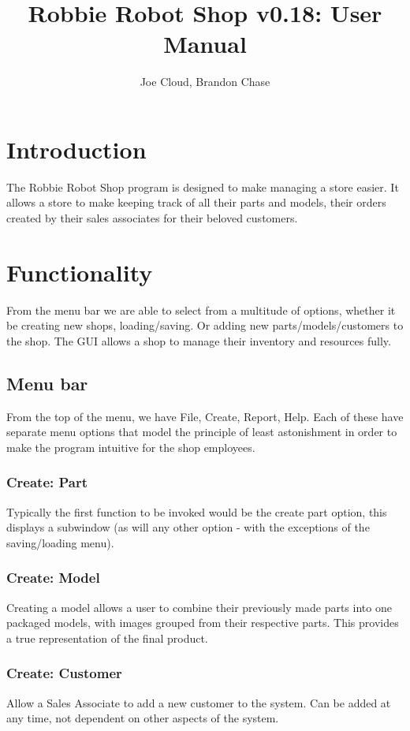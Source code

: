 \documentclass{article}
\title{Robbie Robot Shop v0.18: User Manual}
\author{Joe Cloud, Brandon Chase}
\begin{document}
\maketitle 

\section{Introduction}

The Robbie Robot Shop program is designed to make managing a store easier. It allows a store to make keeping track of all their parts and models, their orders created by their sales associates for their beloved customers. 

\section{Functionality}
From the menu bar we are able to select from a multitude of options, whether it be creating new shops, loading/saving. Or adding new parts/models/customers to the shop. The GUI allows a shop to manage their inventory and resources fully.
\subsection{Menu bar}
From the top of the menu, we have File, Create, Report, Help.
Each of these have separate menu options that model the principle of least astonishment in order to make the program intuitive for the shop employees.

\subsubsection{Create: Part}
Typically the first function to be invoked would be the create part option, this displays a subwindow (as will any other option - with the exceptions of the saving/loading menu).
\subsubsection{Create: Model}
Creating a model allows a user to combine their previously made parts into one packaged models, with images grouped from their respective parts. This provides a true representation of the final product.
\subsubsection{Create: Customer}
Allow a Sales Associate to add a new customer to the system.
Can be added at any time, not dependent on other aspects of the system.
\end{document}
